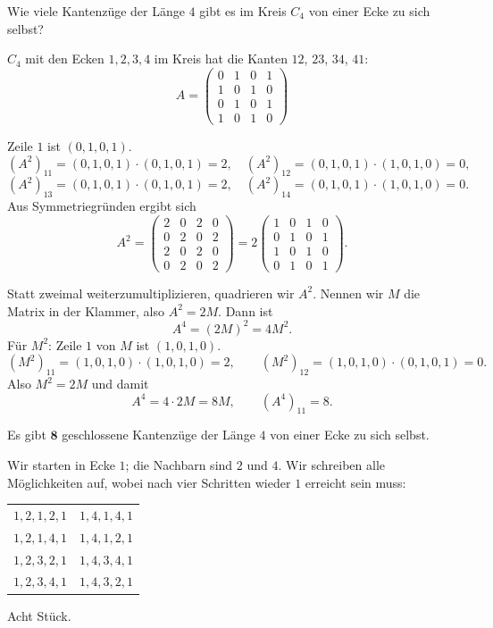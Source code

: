 \begin{aufgabe}
Wie viele Kantenzüge der Länge $4$ gibt es im Kreis $C_4$ von einer Ecke zu sich selbst?

\loesung
{}
$C_4$ mit den Ecken $1,2,3,4$ im Kreis hat die Kanten $12$, $23$, $34$, $41$:
\[ A = \begin{pmatrix} 0&1&0&1 \\ 1&0&1&0 \\ 0&1&0&1 \\ 1&0&1&0 \end{pmatrix} \]

Zeile $1$ ist $(0,1,0,1)$.
\[ (A^2)_{11} = (0,1,0,1)\cdot(0,1,0,1) = 2, \quad (A^2)_{12} = (0,1,0,1)\cdot(1,0,1,0) = 0, \]
\[ (A^2)_{13} = (0,1,0,1)\cdot(0,1,0,1) = 2, \quad (A^2)_{14} = (0,1,0,1)\cdot(1,0,1,0) = 0 . \]
Aus Symmetriegründen ergibt sich
\[ A^2 = \begin{pmatrix} 2&0&2&0 \\ 0&2&0&2 \\ 2&0&2&0 \\ 0&2&0&2 \end{pmatrix} = 2 \begin{pmatrix} 1&0&1&0 \\ 0&1&0&1 \\ 1&0&1&0 \\ 0&1&0&1 \end{pmatrix}. \]

Statt zweimal weiterzumultiplizieren, quadrieren wir $A^2$. Nennen wir $M$ die Matrix in der Klammer, also $A^2 = 2M$. Dann ist
\[ A^4 = (2M)^2 = 4 M^2 . \]
Für $M^2$: Zeile $1$ von $M$ ist $(1,0,1,0)$.
\[ (M^2)_{11} = (1,0,1,0)\cdot(1,0,1,0) = 2, \qquad (M^2)_{12} = (1,0,1,0)\cdot(0,1,0,1) = 0 . \]
Also $M^2 = 2M$ und damit
\[ A^4 = 4 \cdot 2M = 8M, \qquad (A^4)_{11} = 8 . \]

Es gibt $\mathbf{8}$ geschlossene Kantenzüge der Länge $4$ von einer Ecke zu sich selbst.

Wir starten in Ecke $1$; die Nachbarn sind $2$ und $4$. Wir schreiben alle Möglichkeiten auf, wobei nach vier Schritten wieder $1$ erreicht sein muss:
\begin{center}
{\small
\renewcommand{\arraystretch}{1.35}
\begin{tabular}{@{}P{2.6cm}P{2.6cm}@{}}
\toprule
$1,2,1,2,1$ & $1,4,1,4,1$\\
$1,2,1,4,1$ & $1,4,1,2,1$\\
$1,2,3,2,1$ & $1,4,3,4,1$\\
$1,2,3,4,1$ & $1,4,3,2,1$\\
\bottomrule
\end{tabular}}
\end{center}
Acht Stück. \checkmark


\end{aufgabe}
